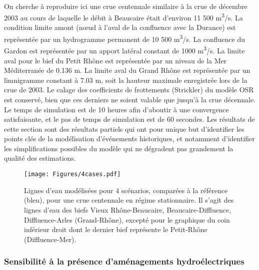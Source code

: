 \documentclass[11pt]{article}
\begin{document}
	\paragraph{} On cherche à reproduire ici une crue centennale similaire à la crue de décembre 2003 au cours de laquelle le débit à Beaucaire était d'environ 11 500 m\textsuperscript{3}/s. La condition limite amont (nœud à l'aval de la confluence avec la Durance) est représentée par un hydrogramme permanent de 10 500 m\textsuperscript{3}/s. La confluence du Gardon est représentée par un apport latéral constant de 1000 m\textsuperscript{3}/s. La limite aval pour le bief du Petit Rhône est représentée par un niveau de la Mer Méditerranée de 0.136 m. La limite aval du Grand Rhône est représentée par un limnigramme constant à 7.03 m, soit la hauteur maximale enregistrée lors de la crue de 2003. Le calage des coefficients de frottements (Strickler) du modèle OSR \citep{launay_zabr-osr_2017} est conservé, bien que ces derniers ne soient valable que jusqu'à la crue décennale. Le temps de simulation est de 10 heures afin d'aboutir à une convergence satisfaisante, et le pas de temps de simulation est de 60 secondes. Les résultats de cette section sont des résultats partiels qui ont pour unique but d'identifier les points clés de la modélisation d'événements historiques, et notamment d'identifier les simplifications possibles du modèle qui ne dégradent pas grandement la qualité des estimations.
	
	\begin{figure}[h]
		\centering
		\texttt{[image: Figures/4cases.pdf]}
        \caption{Lignes d'eau modélisées pour 4 scénarios, comparées à la référence (bleu), pour une crue centennale en régime stationnaire. Il s'agit des lignes d'eau des biefs Vieux Rhône-Beaucaire, Beaucaire-Diffluence, Diffluence-Arles (Grand-Rhône), excepté pour le graphique du coin inférieur droit dont le dernier bief représente le Petit-Rhône (Diffluence-Mer).}
		\label{fig:Sensib4}
	\end{figure}		
			
	
	\subsubsection{Sensibilité à la présence d'aménagements hydroélectriques}
	
\end{document}
